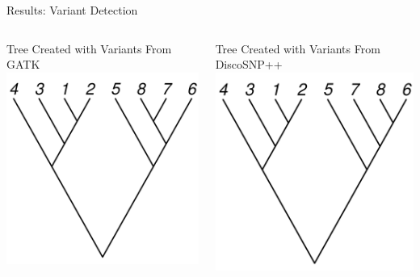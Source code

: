 \documentclass{beamer}
\begin{document}
\begin{frame}{}
\begin{columns}
\begin{block}{Results: Variant Detection}
\begin{columns}
	\begin{block}{Tree Created with Variants From GATK}
	\includegraphics[width=.95\linewidth]{figures/gatk_tree.pdf}
	\end{block}
	\begin{block}{Tree Created with Variants From DiscoSNP++}
	\includegraphics[width=.95\linewidth]{figures/disco_tree.pdf}

\end{block}
\end{columns}
\end{block}
\end{columns}
\end{frame}
\end{document}
